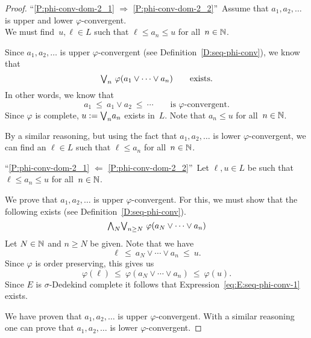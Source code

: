 \documentclass[main.tex]{subfiles}
\begin{document}
\begin{proof}
``\ref{P:phi-conv-dom-2_1}
$\Longrightarrow$
\ref{P:phi-conv-dom-2_2}''\ 
Assume that  $a_1,a_2,\dotsc$ is upper and lower $\varphi$-convergent.\\
We must find~$u,\ell\in L$ such that $\ell\leq a_n \leq u$
for all~$n\in\mathbb{N}$.

Since $a_1,a_2,\dotsc$ is  upper $\varphi$-convergent
(see Definition~\ref{D:seq-phi-conv}), 
we know that 
\begin{equation*}
\textstyle{\bigvee}_n \ \varphi(a_1 \vee \dotsb \vee a_n)\qquad\text{exists.}
\end{equation*}
In other words, we know that
\begin{equation*}
a_1 \ \leq\ a_1 \vee a_2 \ \leq\ \dotsb \qquad\text{is $\varphi$-convergent.}
\end{equation*}
Since $\varphi$ is complete,
$u:= \textstyle{\bigvee}_n a_n$ exists in~$L$.
Note that $a_n \leq u$ for all~$n\in \mathbb{N}$.

By a similar reasoning, but using the fact that
$a_1,a_2,\dotsc$ is lower $\varphi$-convergent,
we can find an $\ell\in L$ 
such that $\ell \leq a_n$ for all~$n\in \mathbb{N}$.
\vspace{.3em}

\noindent
``\ref{P:phi-conv-dom-2_1}
$\Longleftarrow$
\ref{P:phi-conv-dom-2_2}''\ 
Let $\ell,u\in L$ 
be such that  $\ell \leq a_n \leq u$
for all~$n\in\mathbb{N}$.

We prove that $a_1,a_2,\dotsc$
is upper $\varphi$-convergent.
For this,
we must show that the following exists
(see Definition~\ref{D:seq-phi-conv}).
\begin{equation}
\label{eq:E:seq-phi-conv-1}
\textstyle{\bigwedge}_N \textstyle{\bigvee}_{n\geq N}\ \varphi(a_N\vee\dotsb\vee a_n)
\end{equation}
Let $N\in\mathbb{N}$ and $n\geq N$ be given.
Note that we have 
\begin{equation*}
\ell\ \leq\ a_N \vee \dotsb\vee a_n \ \leq\ u.
\end{equation*}
Since $\varphi$ is order preserving, this gives us
\begin{equation*}
\varphi(\ell)\ \leq\ \varphi(a_N \vee \dotsb\vee a_n) \ \leq\ \varphi(u).
\end{equation*}
Since $E$ is $\sigma$-Dedekind complete
it follows that Expression~\eqref{eq:E:seq-phi-conv-1} exists.

We have proven that $a_1,a_2,\dotsc$ 
is upper $\varphi$-convergent.
With a similar reasoning one can prove that
$a_1,a_2,\dotsc$
is lower $\varphi$-convergent.
\end{proof}
\end{document}
